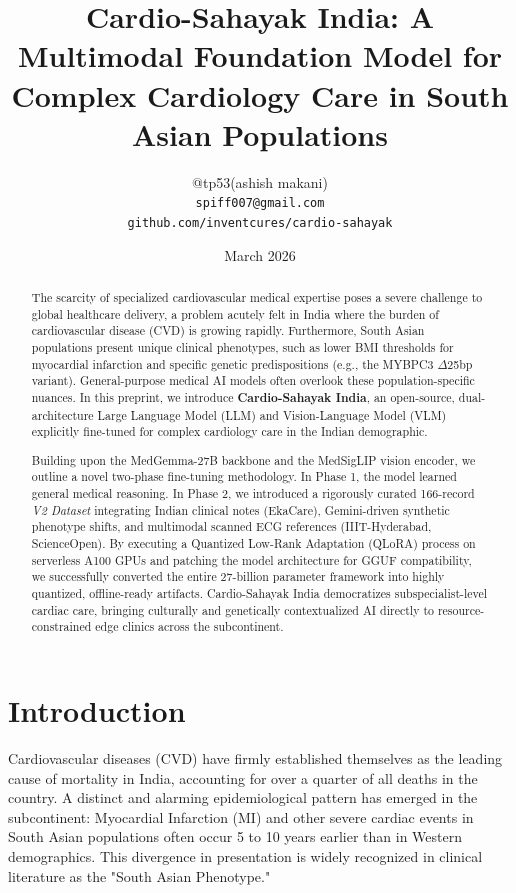\documentclass[11pt,a4paper]{article}
\title{\textbf{Cardio-Sahayak India: A Multimodal Foundation Model for Complex Cardiology Care in South Asian Populations}}
\author{
@tp53(ashish makani) \\
\texttt{spiff007@gmail.com} \\
\texttt{github.com/inventcures/cardio-sahayak}
}
\date{March 2026}
\begin{document}

\maketitle

\begin{abstract}
The scarcity of specialized cardiovascular medical expertise poses a severe challenge to global healthcare delivery, a problem acutely felt in India where the burden of cardiovascular disease (CVD) is growing rapidly. Furthermore, South Asian populations present unique clinical phenotypes, such as lower BMI thresholds for myocardial infarction and specific genetic predispositions (e.g., the MYBPC3 $\Delta$25bp variant). General-purpose medical AI models often overlook these population-specific nuances. In this preprint, we introduce \textbf{Cardio-Sahayak India}, an open-source, dual-architecture Large Language Model (LLM) and Vision-Language Model (VLM) explicitly fine-tuned for complex cardiology care in the Indian demographic. 

Building upon the MedGemma-27B backbone and the MedSigLIP vision encoder, we outline a novel two-phase fine-tuning methodology. In Phase 1, the model learned general medical reasoning. In Phase 2, we introduced a rigorously curated 166-record \textit{V2 Dataset} integrating Indian clinical notes (EkaCare), Gemini-driven synthetic phenotype shifts, and multimodal scanned ECG references (IIIT-Hyderabad, ScienceOpen). By executing a Quantized Low-Rank Adaptation (QLoRA) process on serverless A100 GPUs and patching the model architecture for GGUF compatibility, we successfully converted the entire 27-billion parameter framework into highly quantized, offline-ready artifacts. Cardio-Sahayak India democratizes subspecialist-level cardiac care, bringing culturally and genetically contextualized AI directly to resource-constrained edge clinics across the subcontinent.
\end{abstract}

\newpage

\section{Introduction}

Cardiovascular diseases (CVD) have firmly established themselves as the leading cause of mortality in India, accounting for over a quarter of all deaths in the country. A distinct and alarming epidemiological pattern has emerged in the subcontinent: Myocardial Infarction (MI) and other severe cardiac events in South Asian populations often occur 5 to 10 years earlier than in Western demographics. This divergence in presentation is widely recognized in clinical literature as the "South Asian Phenotype."
\end{document}
